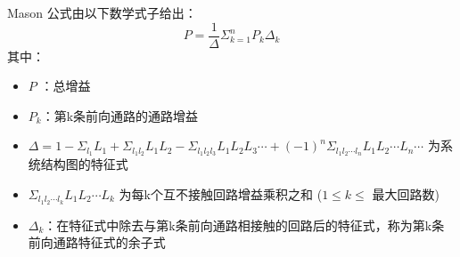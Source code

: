 \begin{definition}
    Mason 公式由以下数学式子给出：
    \begin{equation*}
        P = \frac{1}{\Delta} \Sigma_{k=1}^n P_k \Delta_k
    \end{equation*}
    其中：
    \begin{itemize}
        \item $P$ ：总增益
        \item $P_k$：第k条前向通路的通路增益
        \item $\Delta = 1-\Sigma_{l_1} L_1 + \Sigma_{l_1 l_2} L_1 L_2 -\Sigma_{l_1 l_2 l_3} L_1 L_2 L_3 \cdots +(-1)^n \Sigma_{l_1 l_2 \cdots l_n} L_1 L_2 \cdots L_n \cdots$ 为系统结构图的特征式
        \item $\Sigma_{l_1 l_2 \cdots l_k} L_1 L_2 \cdots L_k$ 为每k个互不接触回路增益乘积之和 ($1\leq k \leq$ 最大回路数)
        \item $\Delta_k$：在特征式中除去与第k条前向通路相接触的回路后的特征式，称为第k条前向通路特征式的余子式
    \end{itemize}
\end{definition}

